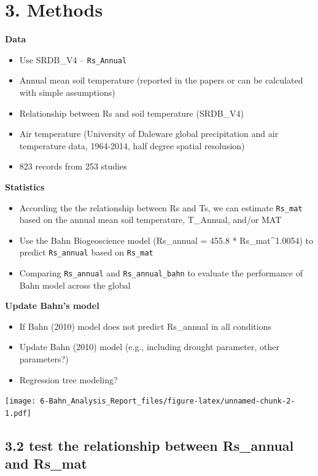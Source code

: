 \documentclass[]{article}
\providecommand{\tightlist}{%
  \setlength{\itemsep}{0pt}\setlength{\parskip}{0pt}}
\begin{document}
\hypertarget{methods}{%
\section{3. Methods}\label{methods}}

\textbf{Data}

\begin{itemize}
\tightlist
\item
  Use SRDB\_V4 -- \texttt{Rs\_Annual}
\item
  Annual mean soil temperature (reported in the papers or can be
  calculated with simple assumptions)
\item
  Relationship between Rs and soil temperature (SRDB\_V4)
\item
  Air temperature (University of Daleware global precipitation and air
  temperature data, 1964-2014, half degree spatial resolusion)
\item
  823 records from 253 studies
\end{itemize}

\textbf{Statistics}

\begin{itemize}
\tightlist
\item
  According the the relationship between Rs and Ts, we can estimate
  \texttt{Rs\_mat} based on the annual mean soil temperature, T\_Annual,
  and/or MAT
\item
  Use the Bahn Biogeoscience model (Rs\_annual = 455.8 *
  Rs\_mat\^{}1.0054) to predict \texttt{Rs\_annual} based on
  \texttt{Rs\_mat}
\item
  Comparing \texttt{Rs\_annual} and \texttt{Rs\_annual\_bahn} to
  evaluate the performance of Bahn model across the global
\end{itemize}

\textbf{Update Bahn's model}

\begin{itemize}
\tightlist
\item
  If Bahn (2010) model does not predict Rs\_annual in all conditions
\item
  Update Bahn (2010) model (e.g., including drought parameter, other
  parameters?)
\item
  Regression tree modeling?
\end{itemize}

\texttt{[image: 6-Bahn\_Analysis\_Report\_files/figure-latex/unnamed-chunk-2-1.pdf]}

\hypertarget{test-the-relationship-between-rs_annual-and-rs_mat}{%
\subsection{3.2 test the relationship between Rs\_annual and
Rs\_mat}\label{test-the-relationship-between-rs_annual-and-rs_mat}}
\end{document}
